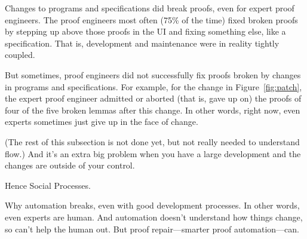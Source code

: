 Changes to programs and specifications did break proofs, even for expert proof engineers.
The proof engineers most often (75\% of the time) fixed broken proofs by stepping 
up above those proofs in the UI and fixing something else, like a specification.
That is, development and maintenance were in reality tightly coupled.

But sometimes, proof engineers did not successfully fix proofs broken by changes in programs and specifications.
For example, for the change in Figure~\ref{fig:patch},
the expert proof engineer admitted or aborted (that is, gave up on) the proofs of four of the five
broken lemmas after this change.
In other words, right now, even experts sometimes just give up in the face of change.

(The rest of this subsection is not done yet, but not really needed to understand flow.)
And it's an extra big problem when you have a large development and the changes are outside of your control.

Hence Social Processes.

Why automation breaks, even with good development processes.
In other words, even experts are human.
And automation doesn't understand how things change, so can't help the human out.
But proof repair---smarter proof automation---can.


%

%

%

%

%

